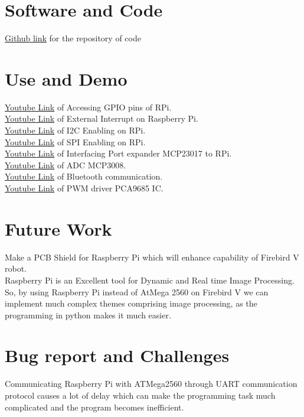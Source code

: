 \documentclass[a4paper,12pt,oneside]{book}
\begin{document}
\section{Software and Code}
\href{https://github.com/eYSIP-2016/eYSIP-Raspberry_Pi_Development_Board}{Github link} for the repository of code

\section{Use and Demo}

\href{https://youtu.be/oxJpwd1q_dY}{Youtube Link} of Accessing GPIO pins of RPi. \\
\href{https://youtu.be/Fn3AqdrCMGo}{Youtube Link} of External Interrupt on Raspberry Pi.\\
\href{https://youtu.be/dhToItyDWhE}{Youtube Link} of I2C Enabling on RPi.\\
\href{https://youtu.be/5fbYMdtAb2E}{Youtube Link} of SPI Enabling on RPi.\\
\href{https://youtu.be/bD0IaSN4_MM}{Youtube Link} of Interfacing Port expander MCP23017 to RPi.\\
\href{https://youtu.be/CWC4LPlKH_k}{Youtube Link} of ADC MCP3008. \\
\href{https://youtu.be/3ISq36l3NLc}{Youtube Link} of Bluetooth communication. \\
\href{https://youtu.be/qROTqvKYI3w}{Youtube Link} of PWM driver PCA9685 IC.   \\


\section{Future Work}
Make a PCB Shield for Raspberry Pi which
will enhance capability of Firebird V robot.\\
Raspberry Pi is an Excellent tool for Dynamic 
and Real time Image Processing. So, by using
Raspberry Pi instead of AtMega 2560 on 
Firebird V we can implement much complex 
themes comprising image processing, as the 
programming in python makes it much easier.

\section{Bug report and Challenges}
Communicating Raspberry Pi with ATMega2560 through UART communication protocol causes a lot of delay which can make the programming task much complicated and the program becomes inefficient.
\end{document}
